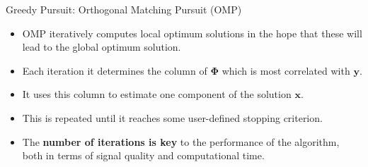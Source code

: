 \documentclass[final]{beamer}
\begin{document}
\begin{frame}{}
\begin{textblock}{36}
\begin{block}{Greedy Pursuit: Orthogonal Matching Pursuit (OMP)}
\begin{itemize}
\item OMP iteratively computes local optimum solutions in the hope that these will lead to the global optimum solution. 
\item Each iteration it determines the column of $\boldsymbol{\Phi}$ which is most correlated with $\boldsymbol{y}$.
\item It uses this column to estimate one component of the solution $\boldsymbol{x}$.
\item This is repeated until it reaches some user-defined stopping criterion. 
\item The \textbf{\textcolor{likePurple}{number of iterations is key}} to the performance of the algorithm, both in terms of signal quality and computational time.
\end{itemize}

\end{block}
\end{textblock}


\end{frame}
\end{document}
